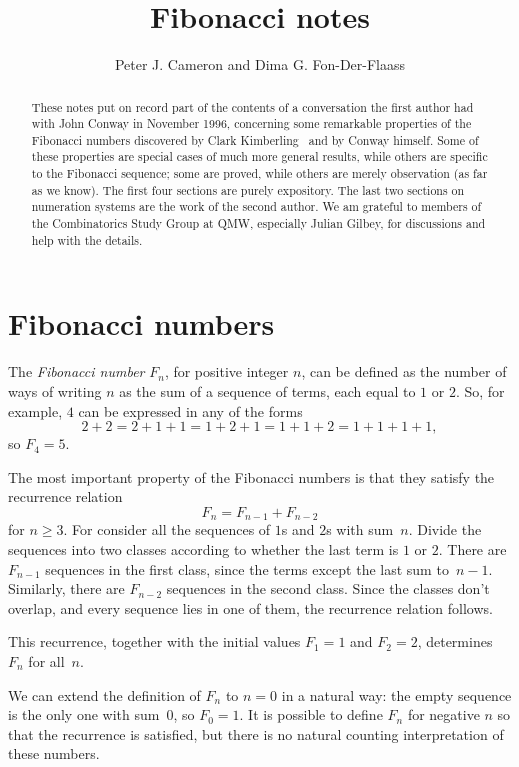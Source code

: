 \documentclass[12pt]{article}
\begin{document}
\title{Fibonacci notes}
\author{Peter J. Cameron and Dima G. Fon-Der-Flaass}
\date{}
\maketitle

\begin{abstract}
These notes put on record part of the contents of a conversation
the first author had with John Conway in November 1996, concerning some
remarkable properties of the Fibonacci numbers discovered by Clark
Kimberling~\cite{kimberling} and by Conway himself. Some of these
properties are special cases of much more general results, while
others are specific to the Fibonacci sequence; some are proved,
while others are merely observation (as far as we know). The first
four sections are purely expository.
The last two sections on numeration systems are the work of the
second author. We am grateful to members of the Combinatorics Study Group
at QMW, especially Julian Gilbey, for discussions and help with the details.
\end{abstract}

\section{Fibonacci numbers}

The \emph{Fibonacci number} $F_n$, for positive integer $n$, can be
defined as the number of ways of writing $n$ as the sum of a
sequence of terms, each equal to $1$ or $2$. So, for example, $4$
can be expressed in any of the forms
\[2+2=2+1+1=1+2+1=1+1+2=1+1+1+1,\]
so $F_4=5$.

The most important property of the Fibonacci numbers is that they
satisfy the recurrence relation
\[F_n=F_{n-1}+F_{n-2}\]
for $n\ge3$. For consider all the sequences of $1$s and $2$s
with sum~$n$. Divide the sequences into two classes according to
whether the last term is $1$ or $2$. There are $F_{n-1}$ sequences
in the first class, since the terms except the last sum to~$n-1$.
Similarly, there are $F_{n-2}$ sequences in the second class.
Since the classes don't overlap, and every sequence lies in one
of them, the recurrence relation follows.

This recurrence, together with the initial values $F_1=1$ and
$F_2=2$, determines $F_n$ for all~$n$.

We can extend the definition of $F_n$ to $n=0$ in a natural way:
the empty sequence is the only one with sum~$0$, so $F_0=1$.
It is possible to define $F_n$ for negative $n$ so that the
recurrence is satisfied, but there is no natural counting
interpretation of these numbers.
\end{document}
